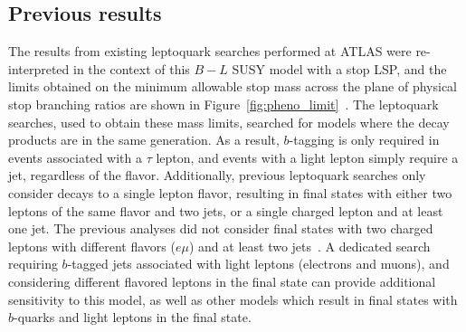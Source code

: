 % 
% 
% 

\FloatBarrier
\subsection{Previous results}

The results from existing leptoquark searches performed at ATLAS were
re-interpreted in the context of this $B-L$ SUSY model with a stop LSP, and the
limits obtained on the minimum allowable stop mass across the plane of
physical stop branching ratios are shown in
Figure~\ref{fig:pheno_limit}~\cite{Marshall:2014cwa,Marshall:2014kea}.
The leptoquark searches, used to obtain these mass limits, searched for
models where the decay products are in the same generation.
As a result, $b$-tagging is only required in events associated with a $\tau$
lepton, and events with a light lepton simply require a jet, regardless of the
flavor.
Additionally, previous leptoquark searches only consider decays to a single
lepton flavor, resulting in final states with either two leptons of the same
flavor and two jets, or a single charged lepton and at least one jet.
The previous analyses did not consider final states with two charged leptons
with different flavors ($e\mu$) and at least two 
jets~\cite{ATLAS:2013oea, ATLAS:2012aq, Aad:2011ch, CMS:2014qpa,
  Chatrchyan:2012sv, Chatrchyan:2012vza, Chatrchyan:2012st}.
A dedicated search requiring $b$-tagged jets associated with light leptons
(electrons and muons), and considering different flavored leptons in the final
state can provide additional sensitivity to this model, as well as other models
which result in final states with $b$-quarks and light leptons in the final
state.

